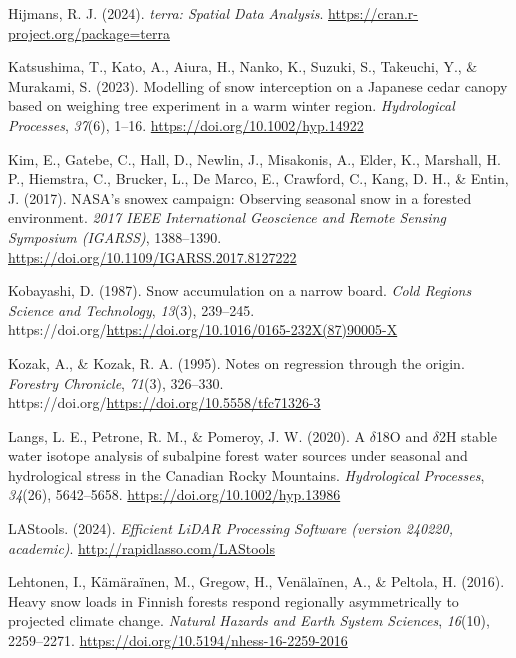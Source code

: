 \documentclass[
  letterpaper,
  DIV=11,
  numbers=noendperiod]{scrartcl}
\newlength{\cslhangindent}
\newenvironment{CSLReferences}[2] %
 {\begin{list}{}{%
  \setlength{\itemindent}{0pt}
  \setlength{\leftmargin}{0pt}
  \setlength{\parsep}{0pt}
  \ifodd #1
   \setlength{\leftmargin}{\cslhangindent}
   \setlength{\itemindent}{-1\cslhangindent}
  \fi
  \setlength{\itemsep}{#2\baselineskip}}}
 {\end{list}}
\begin{document}
\begin{CSLReferences}{1}{0}
Hijmans, R. J. (2024). \emph{{terra: Spatial Data Analysis}}.
\url{https://cran.r-project.org/package=terra}

Katsushima, T., Kato, A., Aiura, H., Nanko, K., Suzuki, S., Takeuchi,
Y., \& Murakami, S. (2023). {Modelling of snow interception on a
Japanese cedar canopy based on weighing tree experiment in a warm winter
region}. \emph{Hydrological Processes}, \emph{37}(6), 1--16.
\url{https://doi.org/10.1002/hyp.14922}

Kim, E., Gatebe, C., Hall, D., Newlin, J., Misakonis, A., Elder, K.,
Marshall, H. P., Hiemstra, C., Brucker, L., De Marco, E., Crawford, C.,
Kang, D. H., \& Entin, J. (2017). {NASA's snowex campaign: Observing
seasonal snow in a forested environment}. \emph{2017 IEEE International
Geoscience and Remote Sensing Symposium (IGARSS)}, 1388--1390.
\url{https://doi.org/10.1109/IGARSS.2017.8127222}

Kobayashi, D. (1987). {Snow accumulation on a narrow board}. \emph{Cold
Regions Science and Technology}, \emph{13}(3), 239--245.
https://doi.org/\url{https://doi.org/10.1016/0165-232X(87)90005-X}

Kozak, A., \& Kozak, R. A. (1995). {Notes on regression through the
origin}. \emph{Forestry Chronicle}, \emph{71}(3), 326--330.
https://doi.org/\url{https://doi.org/10.5558/tfc71326-3}

Langs, L. E., Petrone, R. M., \& Pomeroy, J. W. (2020). {A \(\delta\)18O
and \(\delta\)2H stable water isotope analysis of subalpine forest water
sources under seasonal and hydrological stress in the Canadian Rocky
Mountains}. \emph{Hydrological Processes}, \emph{34}(26), 5642--5658.
\url{https://doi.org/10.1002/hyp.13986}

LAStools. (2024). \emph{{Efficient LiDAR Processing Software (version
240220, academic)}}. \url{http://rapidlasso.com/LAStools}

Lehtonen, I., Kämäraïnen, M., Gregow, H., Venälaïnen, A., \& Peltola, H.
(2016). {Heavy snow loads in Finnish forests respond regionally
asymmetrically to projected climate change}. \emph{Natural Hazards and
Earth System Sciences}, \emph{16}(10), 2259--2271.
\url{https://doi.org/10.5194/nhess-16-2259-2016}


\end{CSLReferences}
\end{document}
